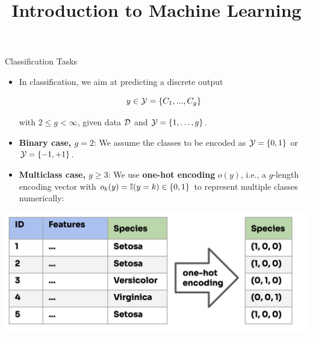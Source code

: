 \documentclass[11pt,compress,t,notes=noshow, xcolor=table]{beamer}
\title{Introduction to Machine Learning}
\begin{document}


\begin{vbframe}{Classification Tasks}

\begin{itemize}
\item In classification, we aim at predicting a discrete output 

$$
y \in \mathcal{Y} = \{C_1, ..., C_g\}
$$

with $2 \le g < \infty$, given data $\mathcal{D}$  and $\mathcal{Y} = \{1, \ldots, g\}$.

\item \textbf{Binary case, $g = 2$}: We assume the classes to be encoded as $\mathcal{Y} = \{0, 1\}$ or $\mathcal{Y} = \{-1, +1\}$.

\item \textbf{Multiclass case, $g \ge 3$}: We use \textbf{one-hot encoding} $o(y)$, i.e., a $g$-length encoding vector with $o_k(y) = \mathbb{I}(y = k) \in \{0,1\}$ to represent multiple classes numerically:

\end{itemize}

\begin{center}
  \includegraphics[width=0.65\linewidth]{figure_man/one-hot_encoding.png} 
\end{center}

\end{vbframe}
\end{document}
